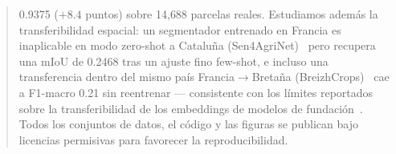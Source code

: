 \begin{abstract}
0.9375 ($+8.4$ puntos) sobre 14{,}688 parcelas reales. Estudiamos además la
transferibilidad espacial: un segmentador entrenado en Francia es
inaplicable en modo zero-shot a Cataluña (Sen4AgriNet)~\cite{sykas2022sen4agrinet}
pero recupera una mIoU de 0.2468 tras un ajuste fino few-shot, e incluso
una transferencia dentro del mismo país Francia$\rightarrow$Bretaña
(BreizhCrops)~\cite{russwurm2020breizhcrops} cae a F1-macro 0.21 sin
reentrenar --- consistente con los límites reportados sobre la
transferibilidad de los embeddings de modelos de
fundación~\cite{harvesting2026alphaearth}. Todos
los conjuntos de datos, el código y las figuras se publican bajo
licencias permisivas para favorecer la reproducibilidad.
\end{abstract}

